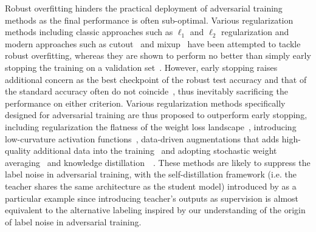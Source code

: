 Robust overfitting hinders the practical deployment of adversarial training methods as the final performance is often sub-optimal. Various regularization methods including classic approaches such as $\ell_1$ and $\ell_2$ regularization and modern approaches such as cutout~\citep{Devries2017ImprovedRO} and mixup~\citep{Zhang2018mixupBE} have been attempted to tackle robust overfitting, whereas they are shown to perform no better than simply early stopping the training on a validation set~\citep{Rice2020OverfittingIA}. However, early stopping raises additional concern as the best checkpoint of the robust test accuracy and that of the standard accuracy often do not coincide~\citep{chen2021robust}, thus inevitably sacrificing the performance on either criterion. Various regularization methods specifically designed for adversarial training are thus proposed to outperform early stopping, including regularization the flatness of the weight loss landscape~\citep{Wu2020AdversarialWP, Stutz2021RelatingAR}, introducing low-curvature activation functions~\citep{Singla2021LowCA}, data-driven augmentations that adds high-quality additional data into the training~\citep{Rebuffi2021FixingDA} and adopting stochastic weight averaging~\citep{Izmailov2018AveragingWL} and knowledge distillation~\citep{Hinton2015DistillingTK}~\citep{chen2021robust}. These methods are likely to suppress the label noise in adversarial training, with the self-distillation framework (i.e. the teacher shares the same architecture as the student model) introduced by \citep{chen2021robust} as a particular example since introducing teacher's outputs as supervision is almost equivalent to the alternative labeling inspired by our understanding of the origin of label noise in adversarial training.



